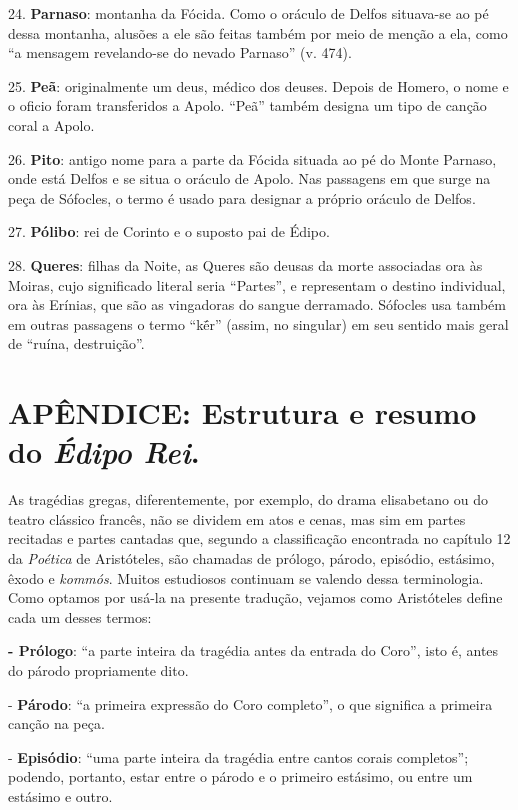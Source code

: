24. \textbf{Parnaso}: montanha da Fócida. Como o oráculo de Delfos
situava-se ao pé dessa montanha, alusões a ele são feitas também por
meio de menção a ela, como ``a mensagem revelando-se do nevado Parnaso''
(v. 474).

25. \textbf{Peã}: originalmente um deus, médico dos deuses. Depois de
Homero, o nome e o oficio foram transferidos a Apolo. ``Peã'' também
designa um tipo de canção coral a Apolo.

26. \textbf{Pito}: antigo nome para a parte da Fócida situada ao pé do
Monte Parnaso, onde está Delfos e se situa o oráculo de Apolo. Nas
passagens em que surge na peça de Sófocles, o termo é usado para
designar a próprio oráculo de Delfos.

27. \textbf{Pólibo}: rei de Corinto e o suposto pai de Édipo.

28. \textbf{Queres}: filhas da Noite, as Queres são deusas da morte
associadas ora às Moiras, cujo significado literal seria ``Partes'', e
representam o destino individual, ora às Erínias, que são as vingadoras
do sangue derramado. Sófocles usa também em outras passagens o termo
``kḗr'' (assim, no singular) em seu sentido mais geral de ``ruína,
destruição''.

\chapter{APÊNDICE: Estrutura e resumo do \emph{Édipo Rei}. }

As tragédias gregas, diferentemente, por exemplo, do drama elisabetano
ou do teatro clássico francês, não se dividem em atos e cenas, mas sim
em partes recitadas e partes cantadas que, segundo a classificação
encontrada no capítulo 12 da \emph{Poética} de Aristóteles, são chamadas
de prólogo, párodo, episódio, estásimo, êxodo e \emph{kommós}. Muitos
estudiosos continuam se valendo dessa terminologia. Como optamos por
usá-la na presente tradução, vejamos como Aristóteles define cada um
desses termos:

\textbf{- Prólogo}: ``a parte inteira da tragédia antes da entrada do
Coro'', isto é, antes do párodo propriamente dito.

- \textbf{Párodo}: ``a primeira expressão do Coro completo'', o que
significa a primeira canção na peça.

- \textbf{Episódio}: ``uma parte inteira da tragédia entre cantos corais
completos''; podendo, portanto, estar entre o párodo e o primeiro
estásimo, ou entre um estásimo e outro.

